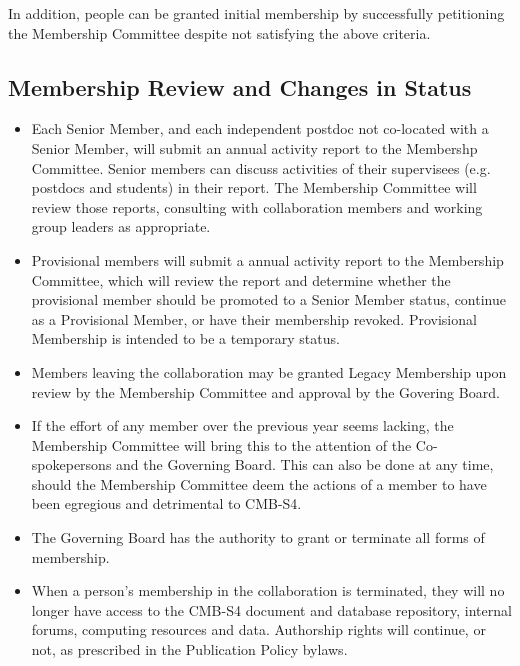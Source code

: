 In addition, people can be granted initial membership by 
successfully petitioning the Membership Committee despite not satisfying the above criteria.  


\subsection{Membership Review and Changes in Status}
\begin{itemize} 

\item Each Senior Member, and each independent postdoc not co-located with a Senior Member, will submit an annual activity report to the Membershp Committee.  Senior members can discuss activities of their supervisees (e.g. postdocs and students) in their report. The Membership Committee will review those reports, consulting with collaboration members and working group leaders as appropriate.

\item Provisional members will submit a annual activity report to the Membership Committee, which will review the report and determine whether the provisional member should be promoted to a Senior Member status, continue as a Provisional Member, or have their membership revoked.  Provisional Membership is intended to be a temporary status.

\item Members leaving the collaboration may be granted Legacy Membership upon review by the Membership Committee and approval by the Govering Board.

\item If the effort of any member over the previous year seems lacking, the Membership Committee will bring this to the attention of the Co-spokepersons and the Governing Board.  This can also be done at any time, should the Membership Committee deem the actions of a member to have been egregious and detrimental to CMB-S4.

\item The Governing Board has the authority to grant or terminate all forms of membership.

\item When a person's membership in the collaboration is terminated, they will no longer have access to the CMB-S4 document and database repository, internal forums, computing resources and data.  Authorship rights will continue, or not, as prescribed in the Publication Policy bylaws.


\end{itemize}


